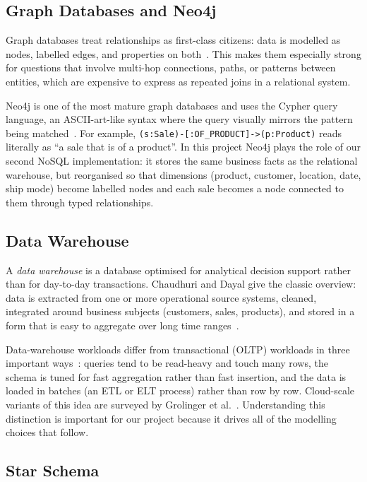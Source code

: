 \documentclass[11pt,a4paper]{article}
\begin{document}
\subsection{Graph Databases and Neo4j}

Graph databases treat relationships as first-class citizens: data is
modelled as nodes, labelled edges, and properties on
both~\cite{angles2008graph,robinson2015graph}. This makes them especially
strong for questions that involve multi-hop connections, paths, or
patterns between entities, which are expensive to express as repeated
joins in a relational system.

Neo4j is one of the most mature graph databases and uses the Cypher query
language, an ASCII-art-like syntax where the query visually mirrors the
pattern being matched~\cite{neo4j_docs,cypher_docs,francis2018cypher}. For
example, \texttt{(s:Sale)-[:OF\_PRODUCT]->(p:Product)} reads literally as
``a sale that is of a product''. In this project Neo4j plays the role of
our second NoSQL implementation: it stores the same business facts as the
relational warehouse, but reorganised so that dimensions (product,
customer, location, date, ship mode) become labelled nodes and each sale
becomes a node connected to them through typed relationships.

\subsection{Data Warehouse}

A \emph{data warehouse} is a database optimised for analytical decision
support rather than for day-to-day transactions. Chaudhuri and Dayal give
the classic overview: data is extracted from one or more operational
source systems, cleaned, integrated around business subjects (customers,
sales, products), and stored in a form that is easy to aggregate over
long time ranges~\cite{chaudhuri1997olap}.

Data-warehouse workloads differ from transactional (OLTP) workloads in
three important ways~\cite{chaudhuri1997olap,kimball2013toolkit}: queries
tend to be read-heavy and touch many rows, the schema is tuned for fast
aggregation rather than fast insertion, and the data is loaded in batches
(an ETL or ELT process) rather than row by row. Cloud-scale variants of
this idea are surveyed by Grolinger et al.~\cite{grolinger2013cloud}.
Understanding this distinction is important for our project because it
drives all of the modelling choices that follow.

\subsection{Star Schema}
\end{document}
